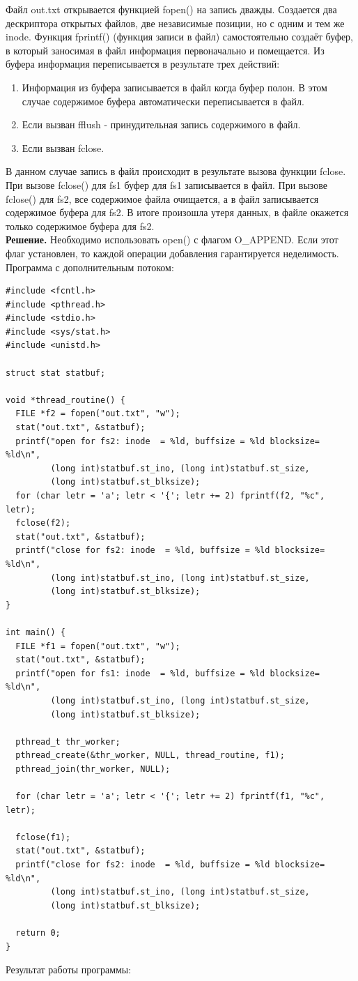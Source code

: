 Файл out.txt открывается функцией fopen() на запись дважды. Создается два дескриптора открытых файлов, две независимые позиции, но с одним и тем же inode. Функция fprintf() (функция записи в файл) самостоятельно создаёт буфер, в который заносимая в файл информация первоначально и помещается. Из буфера информация переписывается в результате трех действий:
\begin{enumerate}
	\item Информация из буфера записывается в файл когда буфер полон. В этом случае содержимое буфера автоматически переписывается в файл.
	\item Если вызван fflush - принудительная запись содержимого в файл.
	\item Если вызван fclose.
\end{enumerate}
В данном случае запись в файл происходит в результате вызова функции fclose. При вызове fclose() для fs1 буфер для fs1 записывается в файл. При вызове fclose() для fs2, все содержимое файла очищается, а в файл записывается содержимое буфера для fs2. В итоге произошла утеря данных, в файле окажется только содержимое буфера для fs2. \\
\textbf{Решение.} Необходимо использовать open() с флагом O\_APPEND. Если этот флаг установлен, то каждой операции добавления гарантируется неделимость. \\
Программа с дополнительным потоком:\newpage
\begin{lstlisting}
#include <fcntl.h>
#include <pthread.h>
#include <stdio.h>
#include <sys/stat.h>
#include <unistd.h>

struct stat statbuf;

void *thread_routine() {
  FILE *f2 = fopen("out.txt", "w");
  stat("out.txt", &statbuf);
  printf("open for fs2: inode  = %ld, buffsize = %ld blocksize= %ld\n",
         (long int)statbuf.st_ino, (long int)statbuf.st_size,
         (long int)statbuf.st_blksize);
  for (char letr = 'a'; letr < '{'; letr += 2) fprintf(f2, "%c", letr);
  fclose(f2);
  stat("out.txt", &statbuf);
  printf("close for fs2: inode  = %ld, buffsize = %ld blocksize= %ld\n",
         (long int)statbuf.st_ino, (long int)statbuf.st_size,
         (long int)statbuf.st_blksize);
}

int main() {
  FILE *f1 = fopen("out.txt", "w");
  stat("out.txt", &statbuf);
  printf("open for fs1: inode  = %ld, buffsize = %ld blocksize= %ld\n",
         (long int)statbuf.st_ino, (long int)statbuf.st_size,
         (long int)statbuf.st_blksize);

  pthread_t thr_worker;
  pthread_create(&thr_worker, NULL, thread_routine, f1);
  pthread_join(thr_worker, NULL);

  for (char letr = 'a'; letr < '{'; letr += 2) fprintf(f1, "%c", letr);

  fclose(f1);
  stat("out.txt", &statbuf);
  printf("close for fs2: inode  = %ld, buffsize = %ld blocksize= %ld\n",
         (long int)statbuf.st_ino, (long int)statbuf.st_size,
         (long int)statbuf.st_blksize);

  return 0;
}
\end{lstlisting}
Результат работы программы:

